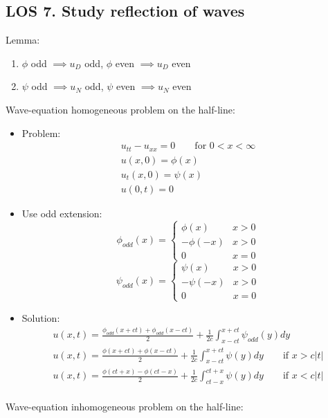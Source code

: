 \documentclass[12pt, a4paper]{article}
\begin{document}
\subsection*{LOS 7. Study reflection of waves}
Lemma:
\begin{enumerate}
    \item $\phi$ odd $\implies u_D$ odd, $\phi$ even $\implies u_D$ even
    \item $\psi$ odd $\implies u_N$ odd, $\psi$ even $\implies u_N$ even \\
\end{enumerate}
Wave-equation homogeneous problem on the half-line:
\begin{itemize}
    \item Problem:
    \begin{gather*}
        u_{tt} - u_{xx} = 0 \qquad\text{for }0<x<\infty\\
        u(x, 0) = \phi(x)\\
        u_t(x,0) = \psi(x)\\
        u(0, t)=0
    \end{gather*}
    \item Use odd extension:
    \[ \phi_{odd}(x) = \begin{cases} 
        \phi(x) & x > 0 \\
        -\phi(-x) & x > 0 \\
        0 & x = 0
     \end{cases}
    \]
    \[ \psi_{odd}(x) = \begin{cases} 
        \psi(x) & x > 0 \\
        -\psi(-x) & x > 0 \\
        0 & x = 0
     \end{cases}
    \]
    \item Solution:
    \begin{gather*}
        u(x, t) = \frac{\phi_{odd}(x+ct) + \phi_{odd}(x-ct)}{2} + \frac{1}{2c} \int_{x-ct}^{x+ct}\psi_{odd}(y)dy \\
        u(x, t) = \frac{\phi(x+ct) + \phi(x-ct)}{2} + \frac{1}{2c} \int_{x-ct}^{x+ct}\psi(y)dy \qquad \text{if } x > c|t|\\
        u(x, t) = \frac{\phi(ct+x) - \phi(ct-x)}{2} + \frac{1}{2c} \int_{ct-x}^{ct+x}\psi(y)dy \qquad \text{if } x < c|t|\\
    \end{gather*}
\end{itemize}
Wave-equation inhomogeneous problem on the half-line:
\end{document}
